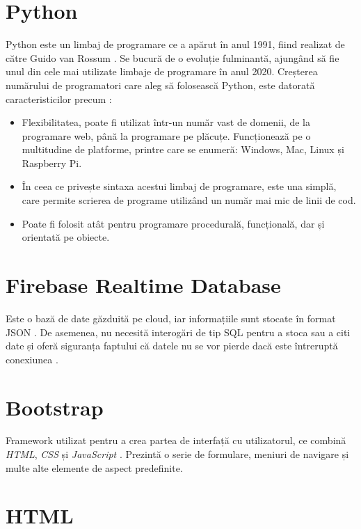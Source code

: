 \section{Python}
	Python este un limbaj de programare ce a apărut în anul 1991, fiind realizat de către Guido van Rossum \cite{python}. Se bucură de o evoluție fulminantă, ajungând să fie unul din cele mai utilizate limbaje de programare în anul 2020. Creșterea numărului de programatori care aleg să folosească Python, este datorată  caracteristicilor precum \cite{python}: 
	\begin{itemize}
	\setlength{\itemindent}{2em}
	\itemsep0em
	\item Flexibilitatea, poate fi utilizat într-un număr vast de domenii, de la programare web, până la programare pe plăcuțe. Funcționează pe o multitudine de platforme, printre care se enumeră: Windows, Mac, Linux și Raspberry Pi. 
	\item În ceea ce privește sintaxa acestui limbaj de programare, este una simplă, care permite scrierea de programe utilizând un număr mai mic de linii de cod. 
	\item Poate fi folosit atât pentru programare procedurală, funcțională, dar și orientată pe obiecte.
	\end{itemize}

\section{Firebase Realtime Database}

	Este o bază de date găzduită pe cloud, iar informațiile sunt stocate în format JSON \cite{firebase}. De asemenea, nu necesită interogări de tip SQL pentru a stoca sau a citi date și oferă siguranța faptului că datele nu se vor pierde dacă este întreruptă conexiunea \cite{firebase}.

\section{Bootstrap}

	Framework utilizat pentru a crea partea de interfață cu utilizatorul, ce combină \textit{HTML}, \textit{CSS} și \textit{JavaScript} \cite{bootstrap}. Prezintă o serie de formulare, meniuri de navigare și multe alte elemente de aspect predefinite.  

\section{HTML}

